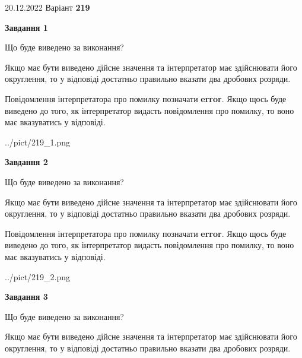 \documentclass[12pt, ukrainian]{article}
\begin{document}
{20.12.2022 Варіант \No \textbf { 219 }\par}
{
\begin {Large}

{\begin {center}\textbf{Завдання 1}\end {center}}\par
Що буде виведено за виконання? \par

Якщо має бути виведено дійсне значення та інтерпретатор має здійснювати його округлення, 
то у відповіді достатньо правильно вказати два дробових розряди.

Повідомлення інтерпретатора про помилку позначати \textbf{error}.
Якщо щось буде виведено до того, як інтерпретатор видасть повідомлення про помилку, 
то воно має вказуватись у відповіді. \par

\begin{center}
	{../pict/219_1.png}
\end{center}
\newpage

{\begin {center}\textbf{Завдання 2}\end {center}}\par
Що буде виведено за виконання? \par

Якщо має бути виведено дійсне значення та інтерпретатор має здійснювати його округлення, 
то у відповіді достатньо правильно вказати два дробових розряди.

Повідомлення інтерпретатора про помилку позначати \textbf{error}.
Якщо щось буде виведено до того, як інтерпретатор видасть повідомлення про помилку, 
то воно має вказуватись у відповіді. \par

\begin{center}
	{../pict/219_2.png}
\end{center}
\newpage

{\begin {center}\textbf{Завдання 3}\end {center}}\par
Що буде виведено за виконання? \par

Якщо має бути виведено дійсне значення та інтерпретатор має здійснювати його округлення, 
то у відповіді достатньо правильно вказати два дробових розряди.


\end{Large}}
\end{document}
